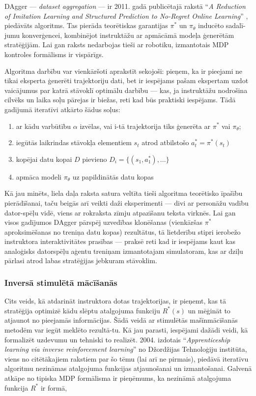 \documentclass[12pt, a4paper]{article}
\numberwithin{equation}{section} %
\begin{document}
DAgger --- \textit{dataset aggregation} --- ir 2011. gadā publicētajā rakstā ``\textit{A Reduction of Imitation Learning and Structured Prediction
to No-Regret Online Learning}'' \cite{ross2011no}, piedāvāts algoritms. Tas pierāda teorētiskas garantijas $\pi^*$ un $\pi_{\theta}$ inducēto sadalī-jumu konverģencei, kombinējot instruktāžu ar apmācāmā modeļa ģenerētām stratēģijām. Lai gan raksts nedarbojas tieši ar robotiku, izmantotais MDP kontroles formālisms ir vispārīgs.

Algoritma darbību var vienkāršoti aprakstīt sekojoši: pieņem, ka ir pieejami ne tikai eksperta ģenerēti trajektoriju dati, bet ir iespējams pašam ekspertam uzdot vaicājumus par katrā stāvoklī optimālu darbību --- kas, ja instruktāžu nodrošina cilvēks un laika soļu pārejas ir biežas, reti kad būs praktiski iespējams. Tādā gadījumā iteratīvi atkārto šādus soļus:

\begin{enumerate}
    \item ar kādu varbūtību $\alpha$ izvēlas, vai i-tā trajektorija tiks ģenerēta ar $\pi^*$ vai $\pi_{\theta}$;
    \item iegūtās laikrindas stāvokļa elementiem $s_t$ atrod atbilstošo $a^*_t=\pi^*(s_t)$ 
    \item kopējai datu kopai $D$ pievieno $D_i=\lbrace (s_1, a^*_1),... \rbrace$
    \item apmāca modeli $\pi_{\theta}$ uz papildinātās datu kopas
\end{enumerate}

Kā jau minēts, liela daļa raksta satura veltīta tieši algoritma teorētisko īpašību pierādīšanai, taču beigās arī veikti daži eksperimenti --- divi ar personāžu vadību dator-spēļu vidē, viens ar rokraksta zīmju atpazīšanu teksta virknēs. Lai gan visos gadījumos DAgger pārspēj uzvedības klonēšanas (vienkāršas $\pi^*$ aproksimēšanas no treniņa datu kopas) rezultātus, tā lietderību stipri ierobežo instruktora interaktivitātes prasības --- praksē reti kad ir iespējams kaut kas analoģisks datorspēļu aģentu treniņam izmantotajam simulatoram, kas ar dziļu pārlasi atrod labas stratēģijas jebkuram stāvoklim.

\subsubsection{Inversā stimulētā mācīšanās}

Cits veids, kā atdarināt instruktora dotas trajektorijas, ir pieņemt, kas tā stratēģija optimizē kādu slēptu atalgojuma funkciju $R^*(s)$ un mēģināt to atjaunot no pieejamās informācijas. Šādā veidā ar stimulētās mašīnmācīšanās metodēm var iegūt meklēto rezultā-tu. Kā jau parasti, iespējami dažādi veidi, kā formalizēt uzdevumu un tehniski to realizēt. 2004. izdotais ``\textit{Apprenticeship learning via inverse reinforcement learning}'' \cite{abbeel2004apprenticeship} no Džordžijas Tehnoloģiju institūta, viens no citētākajiem rakstiem par šo tēmu (lai arī ne pirmais), piedāvā iteratīvu algoritmu nezināmas atalgojuma funkcijas atjaunošanai un izmantošanai. Galvenā atkāpe no tipiska MDP formālisma ir pieņēmums, ka nezināmā atalgojuma funkcija $R^*$ ir formā, 
\end{document}
